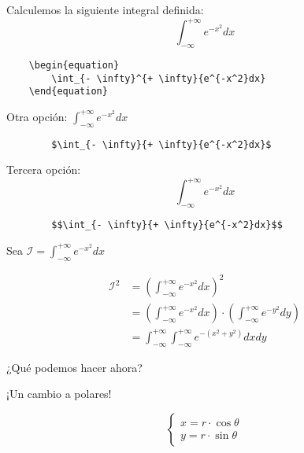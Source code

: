 \begin{frame}[fragile]
    Calculemos la siguiente integral definida:
    \begin{equation*}
        \int_{- \infty}^{+ \infty}{e^{-x^2}dx}
    \end{equation*}
    \begin{verbatim}
    \begin{equation}
        \int_{- \infty}^{+ \infty}{e^{-x^2}dx}
    \end{equation}
    \end{verbatim}
    Otra opción: $\int_{- \infty}^{+ \infty}{e^{-x^2}dx}$
    \begin{verbatim}
        $\int_{- \infty}{+ \infty}{e^{-x^2}dx}$
    \end{verbatim}
    Tercera opción: $$\int_{- \infty}^{+ \infty}{e^{-x^2}dx}$$
    \begin{verbatim}
        $$\int_{- \infty}{+ \infty}{e^{-x^2}dx}$$
    \end{verbatim}
\end{frame}

\begin{frame}[fragile]
    \begin{center}
    Sea $\mathcal{I} = \int_{- \infty}^{+ \infty}{e^{-x^2}dx}$
    \end{center}
    \begin{align*}
        \mathcal{I}^2 &= \left ( \int_{- \infty}^{+ \infty}{e^{-x^2}dx} \right )^2 \\
        &= \left ( \int_{- \infty}^{+ \infty}{e^{-x^2}dx} \right ) \cdot \left ( \int_{- \infty}^{+ \infty}{e^{-y^2}dy} \right ) \\
        &= \int_{- \infty}^{+ \infty} \int_{-\infty}^{+\infty}{e^{-(x^2 + y^2)}dxdy}
    \end{align*}
    \begin{center}
    ¿Qué podemos hacer ahora?
    \end{center}
    \begin{center}
    ¡Un cambio a polares!
    \end{center}
    $$
    \begin{cases}
        x = r \cdot \cos{\theta} \\
        y = r \cdot \sin{\theta}
    \end{cases}
    $$
\end{frame}


